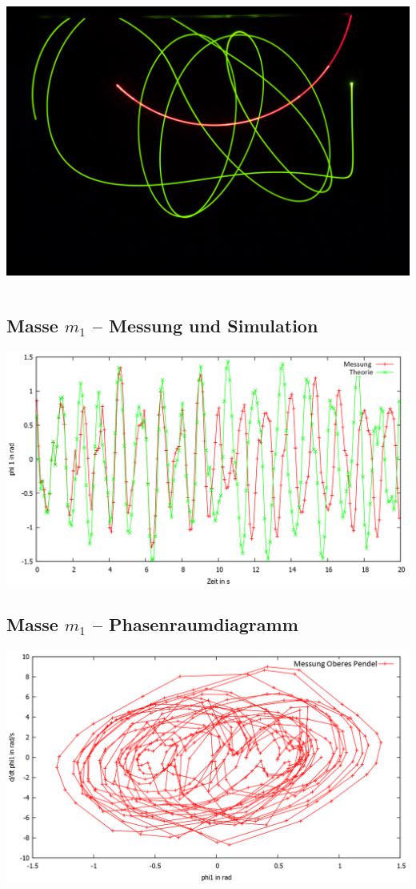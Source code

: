 \begin{frame}
\begin{columns}
	\includegraphics[width=\textwidth]{images/4/pendel-9}
	\end{columns}
\end{frame}

\subsection*{Masse $m_1$ -- Messung und Simulation}
\begin{frame}
	\includegraphics[width=\textwidth]{images/4/phi1uebert}
\end{frame}

\subsection*{Masse $m_1$ -- Phasenraumdiagramm}
\begin{frame}
	\includegraphics[width=\textwidth]{images/4/ph1_ueberphi1}
\end{frame}

